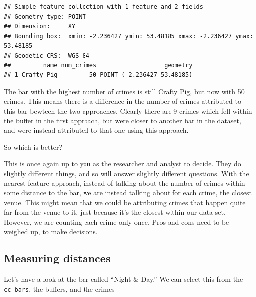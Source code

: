 \documentclass[
]{book}
\makeatletter
\newenvironment{Shaded}{\begin{snugshade}}{\end{snugshade}}
\newcommand{\DecValTok}[1]{\textcolor[rgb]{0.06,0.06,0.06}{#1}}
\newcommand{\FunctionTok}[1]{\textcolor[rgb]{0,0,0}{#1}}
\newcommand{\NormalTok}[1]{#1}
\newcommand{\OtherTok}[1]{\textcolor[rgb]{0.37,0.37,0.37}{#1}}
\newcommand{\SpecialCharTok}[1]{\textcolor[rgb]{0,0,0}{#1}}
\newcommand{\StringTok}[1]{\textcolor[rgb]{0.5,0.5,0.5}{#1}}
\newenvironment{kframe}{%
\medskip{}
\setlength{\fboxsep}{.8em}
 \def\at@end@of@kframe{}%
 \ifinner\ifhmode%
  \def\at@end@of@kframe{\end{minipage}}%
  \begin{minipage}{\columnwidth}%
 \fi\fi%
 \def\FrameCommand##1{\hskip\@totalleftmargin \hskip-\fboxsep
 \colorbox{shadecolor}{##1}\hskip-\fboxsep
     \hskip-\linewidth \hskip-\@totalleftmargin \hskip\columnwidth}%
 \MakeFramed {\advance\hsize-\width
   \@totalleftmargin\z@ \linewidth\hsize
   \@setminipage}}%
 {\par\unskip\endMakeFramed%
 \at@end@of@kframe}
\renewenvironment{Shaded}{\begin{kframe}}{\end{kframe}}
\makeatother
\begin{document}
\begin{verbatim}
## Simple feature collection with 1 feature and 2 fields
## Geometry type: POINT
## Dimension:     XY
## Bounding box:  xmin: -2.236427 ymin: 53.48185 xmax: -2.236427 ymax: 53.48185
## Geodetic CRS:  WGS 84
##         name num_crimes                   geometry
## 1 Crafty Pig         50 POINT (-2.236427 53.48185)
\end{verbatim}

The bar with the highest number of crimes is still Crafty Pig, but now with 50 crimes. This means there is a difference in the number of crimes attributed to this bar bewteen the two approaches. Clearly there are 9 crimes which fell within the buffer in the first approach, but were closer to another bar in the dataset, and were instead attributed to that one using this approach.

So which is better?

This is once again up to you as the researcher and analyst to decide. They do slightly different things, and so will answer slightly different questions. With the nearest feature approach, instead of talking about the number of crimes within some distance to the bar, we are instead talking about for each crime, the closest venue. This might mean that we could be attributing crimes that happen quite far from the venue to it, just because it's the closest within our data set. However, we are counting each crime only once. Pros and cons need to be weighed up, to make decisions.

\hypertarget{measuring-distances}{%
\subsection{Measuring distances}\label{measuring-distances}}

Let's have a look at the bar called ``Night \& Day.'' We can select this from the \texttt{cc\_bars}, the buffers, and the crimes

\begin{Shaded}
\end{Shaded}
\end{document}
